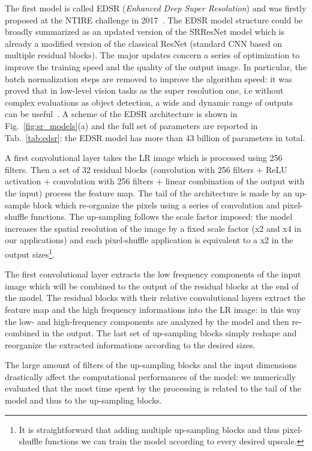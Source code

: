 \documentclass{standalone}
\begin{document}
The first model is called EDSR (\emph{Enhanced Deep Super Resolution}) and was firstly proposed at the NTIRE challenge in 2017~\cite{Agustsson_2017_CVPR_Workshops}.
The EDSR model structure could be broadly summarized as an updated version of the SRResNet model which is already a modified version of the classical ResNet (standard CNN based on multiple residual blocks).
The major updates concern a series of optimization to improve the training speed and the quality of the output image.
In particular, the batch normalization steps are removed to improve the algorithm speed: it was proved that in low-level vision tasks as the super resolution one, i.e without complex evaluations as object detection, a wide and dynamic range of outputs can be useful~\cite{edsr}.
A scheme of the EDSR architecture is shown in Fig.~\ref{fig:sr_models}(a) and the full set of parameters are reported in Tab.~\ref{tab:edsr}: the EDSR model has more than 43 billion of parameters in total.

A first convolutional layer takes the LR image which is processed using 256 filters.
Then a set of 32 residual blocks (convolution with 256 filters + ReLU activation + convolution with 256 filters + linear combination of the output with the input) process the feature map.
The tail of the architecture is made by an up-sample block which re-organize the pixels using a series of convolution and pixel-shuffle functions.
The up-sampling follows the scale factor imposed: the model increases the spatial resolution of the image by a fixed scale factor (x2 and x4 in our applications) and each pixel-shuffle application is equivalent to a x2 in the output sizes\footnote{
  It is straightforward that adding multiple up-sampling blocks and thus pixel-shuffle functions we can train the model according to every desired upscale.
}.

The first convolutional layer extracts the low frequency components of the input image which will be combined to the output of the residual blocks at the end of the model.
The residual blocks with their relative convolutional layers extract the feature map and the high frequency informations into the LR image: in this way the low- and high-frequency components are  analyzed by the model and then re-combined in the output.
The last set of up-sampling blocks simply reshape and reorganize the extracted informations according to the desired sizes.

The large amount of filters of the up-sampling blocks and the input dimensions drastically affect the computational performances of the model: we numerically evaluated that the most time spent by the processing is related to the tail of the model and thus to the up-sampling blocks.
\end{document}

